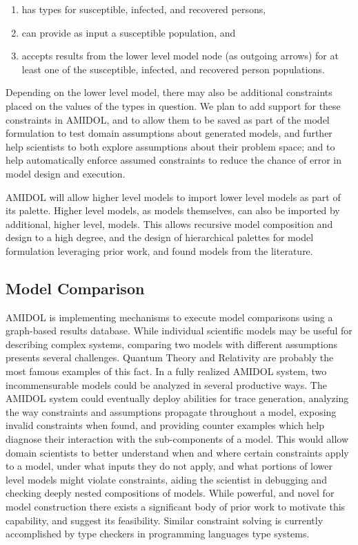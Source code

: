 \documentclass[12pt]{galois-whitepaper}
\begin{document}
\begin{enumerate}
\item has types for susceptible, infected, and recovered persons,
\item can provide as input a susceptible population, and
\item accepts results from the lower level model node (as outgoing arrows)
  for at least one of the susceptible, infected, and recovered person
  populations.
\end{enumerate}

Depending on the lower level model, there may also be
additional constraints placed on the values of the types in
question. We plan to add support for these constraints in AMIDOL, and
to allow them to be saved as part of the model formulation to test
domain assumptions about generated models, and further help scientists
to both explore assumptions about their problem space; and to help
automatically enforce assumed constraints to reduce the chance of
error in model design and execution.

AMIDOL will allow higher level models to import lower level models as
part of its palette.  Higher level models, as models themselves, can
also be imported by additional, higher level, models.  This allows
recursive model composition and design to a high degree, and the
design of hierarchical palettes for model formulation leveraging prior
work, and found models from the literature.

\subsection{Model Comparison}

AMIDOL is implementing mechanisms to execute model comparisons using a
graph-based results database.  While individual scientific models may
be useful for describing complex systems, comparing two models with
different assumptions presents several challenges.
Quantum Theory and Relativity are probably the most famous examples of
this fact. In a fully realized AMIDOL system, two incommensurable
models could be analyzed in several productive ways. The AMIDOL system
could eventually deploy abilities for trace generation, analyzing the
way constraints and assumptions propagate throughout a model, exposing
invalid constraints when found, and providing counter examples which
help diagnose their interaction with the sub-components of a model.
This would allow domain scientists to better understand when and where
certain constraints apply to a model, under what inputs they do not
apply, and what portions of lower level models might violate
constraints, aiding the scientist in debugging and checking deeply
nested compositions of models.  While powerful, and novel for model
construction there exists a significant body of prior work to motivate
this capability, and suggest its feasibility.  Similar constraint
solving is currently accomplished by type checkers in programming
languages type systems.
\end{document}
